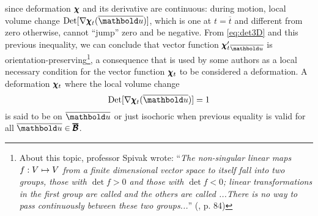 since deformation $\pmb{\chi}$ and its derivative are continuous: during motion, local volume change $\textnormal{Det}[\fua{\nabla\tnr{\chi}_{t}}{\overline{\vto{u}}}]$, which is one at $t=\overline{t}$ and different from zero otherwise, cannot ``jump'' zero and be negative. From \eqref{eq:det3D} and this previous inequality, we can conclude that vector function ${\tnr{\chi}'_t}_{\overline{\vto{u}}}$ is orientation-preserving\footnote{About this topic, professor Spivak wrote: ``\emph{The non-singular linear maps $f : V \mapsto V$ from a finite dimensional vector space to itself fall into two groups, those with $\det f>0$ and those with $\det f<0$; linear transformations in the first group are called  and the others are called ...There is no way to pass continuously between these two groups...}'' (\cite{spivak_2005_1}, p. 84)}, a consequence that is used by some authors as a local necessary condition for the vector function $\pmb{\chi}_t$ to be considered a deformation. A deformation  $\pmb{\chi}_t$ where the local volume change
\begin{equation}
\textnormal{Det}[\fua{\nabla\tnr{\chi}_t}{\overline{\vto{u}}}]=1
\end{equation}
is said to be  on $\overline{\vto{u}}$ or just isochoric when previous equality is valid for all $\overline{\vto{u}}\in\tnr{\overline{\mathcal{B}}}$. 


